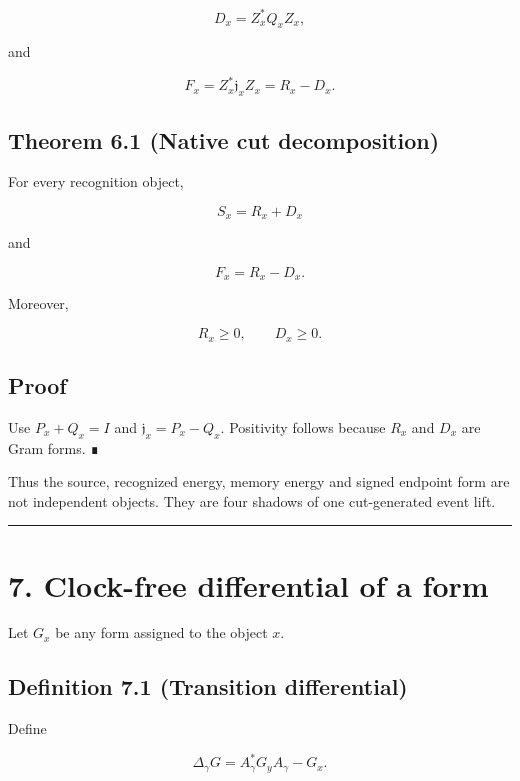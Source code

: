 \[
D_x=Z_x^*Q_xZ_x,
\]

and

\[
F_x=Z_x^*\mathfrak j_xZ_x=R_x-D_x.
\]

\hypertarget{theorem-6.1-native-cut-decomposition}{%
\subsection{Theorem 6.1 (Native cut decomposition)}\label{theorem-6.1-native-cut-decomposition}}

For every recognition object,

\[
\boxed{S_x=R_x+D_x}
\]

and

\[
\boxed{F_x=R_x-D_x.}
\]

Moreover,

\[
R_x\ge0,
\qquad
D_x\ge0.
\]

\hypertarget{proof-1}{%
\subsection{Proof}\label{proof-1}}

Use \(P_x+Q_x=I\) and \(\mathfrak j_x=P_x-Q_x\). Positivity follows because
\(R_x\) and \(D_x\) are Gram forms. ∎

Thus the source, recognized energy, memory energy and signed endpoint form are
not independent objects. They are four shadows of one cut-generated event
lift.

\begin{center}\rule{0.5\linewidth}{0.5pt}\end{center}

\hypertarget{clock-free-differential-of-a-form}{%
\section{7. Clock-free differential of a form}\label{clock-free-differential-of-a-form}}

Let \(G_x\) be any form assigned to the object \(x\).

\hypertarget{definition-7.1-transition-differential}{%
\subsection{Definition 7.1 (Transition differential)}\label{definition-7.1-transition-differential}}

Define

\[
\boxed{
\Delta_\gamma G
=A_\gamma^*G_yA_\gamma-G_x.
}
\]

